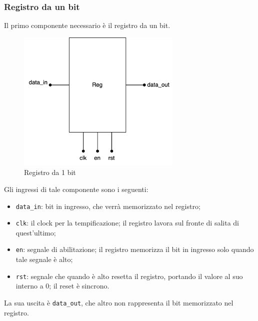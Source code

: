 \subsubsection{Registro da un bit}
Il primo componente necessario è il registro da un bit.
\begin{figure}[H]
	\centering
	\includegraphics[width=0.7\textwidth]{img/reg.png}
	\caption{Registro da 1 bit}
	\label{shf_reg_beh_sim} 
\end{figure}
Gli ingressi di tale componente sono i seguenti:
\begin{itemize}
    \item \texttt{data\_in}: bit in ingresso, che verrà memorizzato nel registro;
    \item \texttt{clk}: il clock per la tempificazione; il registro lavora sul fronte di salita di quest'ultimo;
    \item \texttt{en}: segnale di abilitazione; il registro memorizza il bit in ingresso solo quando tale segnale è alto;
    \item \texttt{rst}: segnale che quando è alto resetta il registro, portando il valore al suo interno a 0; il reset è sincrono.
\end{itemize}
La sua uscita è \texttt{data\_out}, che altro non rappresenta il bit memorizzato nel registro.
